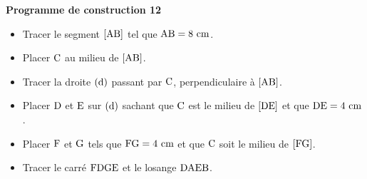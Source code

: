 \documentclass[exercice,a4]{thedocument}%
\begin{document}
%
\noindent\textbf{Programme de construction 12}\par\smallskip\noindent
\begin{itemize}
    \item Tracer le segment $[\text{AB}]$ tel que
    $\text{AB}=8\text{ cm}$.
    \item Placer $\text{C}$ au milieu de $[\text{AB}]$.
    \item Tracer la droite $(\text{d})$ passant par
    $\text{C}$, perpendiculaire à $[\text{AB}]$.
    \item Placer $\text{D}$ et $\text{E}$ sur
    $(\text{d})$ sachant que $\text{C}$ est le milieu de
    $[\text{DE}]$ et que $\text{DE}=4\text{ cm}$.
    \item Placer $\text{F}$ et $\text{G}$ tels que
    $\text{FG}=4\text{ cm}$ et que $\text{C}$ soit le milieu
    de $[\text{FG}]$.
    \item Tracer le carré $\text{FDGE}$ et le losange
    $\text{DAEB}$.
\end{itemize}
\end{document}
